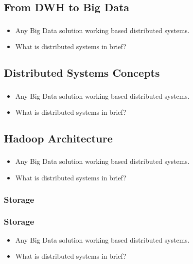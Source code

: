 

\subsection{From DWH to Big Data}
\begin{frame}
\frametitle{\subsecname}
\begin{itemize}[<+->]
	\item Any Big Data solution working based distributed systems.
	\item What is distributed systems in brief?
\end{itemize}
\end{frame}


\subsection{Distributed Systems Concepts}
\begin{frame}
\frametitle{\subsecname}
\begin{itemize}[<+->]
	\item Any Big Data solution working based distributed systems.
	\item What is distributed systems in brief?
\end{itemize}
\end{frame}


\subsection{Hadoop Architecture}
\begin{frame}
\frametitle{\subsecname}
\begin{itemize}[<+->]
	\item Any Big Data solution working based distributed systems.
	\item What is distributed systems in brief?
\end{itemize}
\end{frame}



\subsubsection{Storage}
\begin{frame}
\frametitle{Storage}
\begin{itemize}[<+->]
	\item Any Big Data solution working based distributed systems.
	\item What is distributed systems in brief?
\end{itemize}
\end{frame}

